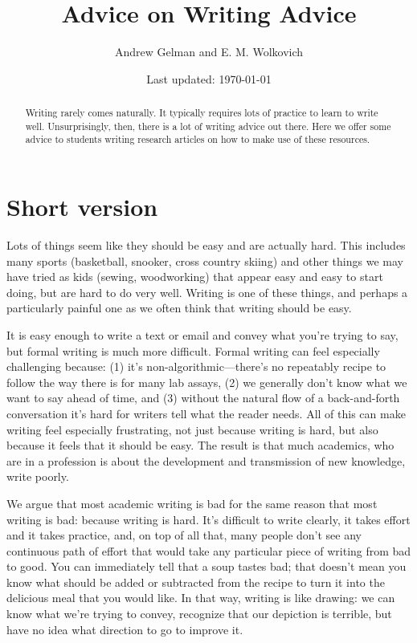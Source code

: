 \documentclass[11pt,letter]{article}
\begin{document}


\title{Advice on Writing Advice}
\author{Andrew Gelman  and E. M. Wolkovich}
\date{Last updated: \today}
\maketitle

\begin{abstract}
Writing rarely comes naturally. It typically requires lots of practice to learn to write well.  Unsurprisingly, then, there is a lot of writing advice out there. Here we offer some advice to students writing research articles on how to make use of these resources. 
\end{abstract}

\section{Short version}

Lots of things seem like they should be easy and are actually hard. This includes many sports (basketball, snooker, cross country skiing) and other things we may have tried as kids (sewing, woodworking) that appear easy and easy to start doing, but are hard to do very well. Writing is one of these things, and perhaps a particularly painful one as we often think that writing should be easy. 

It is easy enough to write a text or email and convey what you’re trying to say, but formal writing is much more difficult. Formal writing can feel especially challenging because: (1) it's non-algorithmic---there's no repeatably recipe to follow the way there is for many lab assays, (2) we generally don't know what we want to say ahead of time, and (3) without the natural flow of a back-and-forth conversation it's hard for writers tell what the reader needs. All of this can make writing feel especially frustrating, not just because writing is hard, but also because it feels that it should be easy. The result is that much academics, who are in a profession is about the development and transmission of new knowledge, write poorly. 

We argue that most academic writing is bad for the same reason that most writing is bad: because writing is hard.  It’s difficult to write clearly, it takes effort and it takes practice, and, on top of all that, many people don’t see any continuous path of effort that would take any particular piece of writing from bad to good.  You can immediately tell that a soup tastes bad; that doesn’t mean you know what should be added or subtracted from the recipe to turn it into the delicious meal that you would like.  In that way, writing is like drawing:  we can know what we’re trying to convey, recognize that our depiction is terrible, but have no idea what direction to go to improve it.
\end{document}
